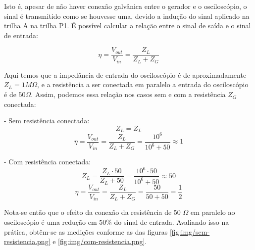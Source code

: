 \documentclass[12pt]{article}
\begin{document}
Isto é, apesar de não haver conexão galvânica entre o gerador e o
osciloscópio, o sinal é transmitido como se houvesse uma, devido a
indução do sinal aplicado na trilha A na trilha P1. É possível
calcular a relação  entre o sinal de saída e o sinal de entrada:

\begin{equation}
  \eta = \frac{V_{out}}{V_{in}} = \frac{Z_L}{Z_L + Z_G}
\end{equation}

Aqui temos que a impedância de entrada do osciloscópio é de
aproximadamente $Z_L=1 M\Omega $, e a resistência a ser conectada em paralelo a
entrada do osciloscópio  é de $50\Omega$. Assim, podemos essa relação nos
casos sem e com a resistência  $Z_G$ conectada:

- Sem resistência conectada:
\begin{equation}
  Z_L = Z_L
\end{equation}
\begin{equation}
  \eta = \frac{V_{out}}{V_{in}} = \frac{Z_L}{Z_L + Z_G} =
  \frac{10^6}{10^6 + 50} \approx 1
\end{equation}

- Com resistência conectada:
\begin{equation}
  Z_L = \frac{Z_L \cdot 50}{Z_L + 50} = \frac{10^6 \cdot 50}{10^6 +
  50} \approx 50
\end{equation}
\begin{equation}
  \eta = \frac{V_{out}}{V_{in}} = \frac{Z_L}{Z_L + Z_G} =
  \frac{50}{50 + 50} = \frac{1}{2}
\end{equation}

Nota-se então que o efeito da conexão da resistência de 50 $\Omega$ em
paralelo ao osciloscópio é uma redução em 50\% do sinal de entrada.
Avaliando isso na prática, obtêm-se as medições conforme as das
figuras \ref{fig:img/sem-resistencia.png} e \ref{fig:img/com-resistencia.png}.
\end{document}
